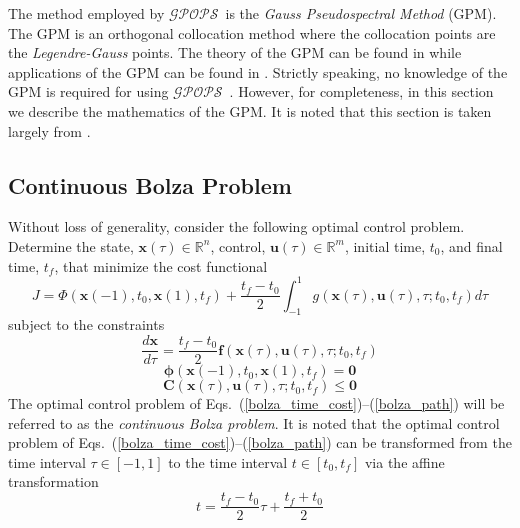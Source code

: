 \documentclass[10pt,final]{report}
\newcommand{\gpops}{$\mathcal{GPOPS}$~}
\begin{document}
The method employed by \gpops is the {\em Gauss Pseudospectral
Method} (GPM).  The GPM is an orthogonal collocation method where
the collocation points are the {\em Legendre-Gauss} points.  The
theory of the GPM can be found in \cite{Benson1,Benson2,Huntington6} while
applications of the GPM can be found in
\cite{Huntington1,Huntington2,Huntington3,Huntington4}. Strictly
speaking, no knowledge of the GPM is required for using \gpops.
However, for completeness, in this section we describe the
mathematics of the GPM.  It is noted that this section is taken
largely from .

\subsection{Continuous Bolza Problem \label{Bolza prob}}

Without loss of generality, consider the following optimal control problem.
Determine the state, $\textbf{x}(\tau)\in\mathbb{R}^n$, control,
$\textbf{u}(\tau)\in\mathbb{R}^m$, initial time, $t_0$, and final
time, $t_f$, that minimize the cost functional
\begin{equation}\label{bolza_time_cost}
  J = \Phi(\textbf{x}(-1),t_0,\textbf{x}(1),t_f) + \frac{t_f-t_0}{2}\int_{-1}^{1}
  g(\textbf{x}(\tau),\textbf{u}(\tau),\tau;t_0,t_f) d\tau
\end{equation}
subject to the constraints
\begin{equation}\label{bolza_time_dyn}
  \displaystyle \frac{d \textbf{x}}{d\tau} = \frac{t_f-t_0}{2}
\textbf{f}(\textbf{x}(\tau),\textbf{u}(\tau),\tau;t_0,t_f)
\end{equation}
\begin{equation}\label{bolza_time_bound}
  \boldsymbol{\phi}(\textbf{x}(-1),t_0,\textbf{x}(1),t_f) = \textbf{0}
\end{equation}
\begin{equation}\label{bolza_path}
  \textbf{C}(\textbf{x}(\tau),\textbf{u}(\tau),\tau;t_0,t_f) \leq \textbf{0}
\end{equation}
The optimal control problem of
Eqs.~(\ref{bolza_time_cost})--(\ref{bolza_path}) will be referred to
as the {\em continuous Bolza problem}.  It is noted that the optimal
control problem of Eqs.~(\ref{bolza_time_cost})--(\ref{bolza_path})
can be transformed from the time interval $\tau\in[-1,1]$ to the time
interval $t\in\left[t_0,t_f\right]$ via the affine transformation
\begin{equation}\label{time_map}
  t = \frac{t_f - t_0}{2} \tau + \frac{t_f + t_0}{2}
\end{equation}
\end{document}
